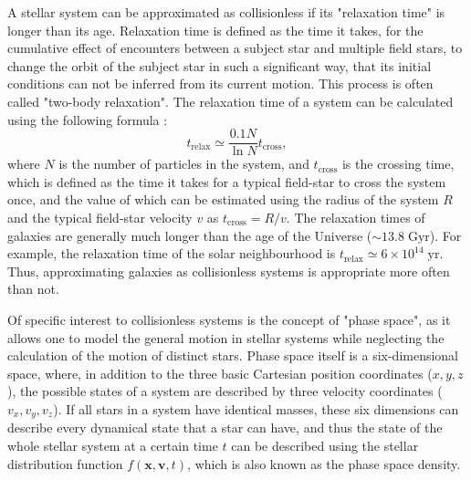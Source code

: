\documentclass[english, oneside]{HYgradu}
\begin{document}
A stellar system can be approximated as collisionless if its "relaxation time" is longer than its age. Relaxation time is defined as the time it takes, for the cumulative effect of encounters between a subject star and multiple field stars, to change the orbit of the subject star in such a significant way, that its initial conditions can not be inferred from its current motion. This process is often called "two-body relaxation". The relaxation time of a system can be calculated using the following formula \citep{BinneyTremaine}:
\begin{equation}
t_\mathrm{relax} \simeq \frac{0.1N}{\ln N} t_\mathrm{cross},
\end{equation}
where $N$ is the number of particles in the system, and $t_\mathrm{cross}$ is the crossing time, which is defined as the time it takes for a typical field-star to cross the system once, and the value of which can be estimated using the radius of the system $R$ and the typical field-star velocity $v$ as $t_\mathrm{cross} = R/v$. The relaxation times of galaxies are generally much longer than the age of the Universe ($\sim 13.8 \; \mathrm{Gyr}$). For example, the relaxation time of the solar neighbourhood is $t_\mathrm{relax} \simeq 6 \times 10^{14} \; \mathrm{yr}$. Thus, approximating galaxies as collisionless systems is appropriate more often than not.

Of specific interest to collisionless systems is the concept of "phase space", as it allows one to model the general motion in stellar systems while neglecting the calculation of the motion of distinct stars. Phase space itself is a six-dimensional space, where, in addition to the three basic Cartesian position coordinates ($x, y, z$), the possible states of a system are described by three velocity coordinates ($v_x, v_y, v_z$). If all stars in a system have identical masses, these six dimensions can describe every dynamical state that a star can have, and thus the state of the whole stellar system at a certain time $t$ can be described using the stellar distribution function $f(\mathbf{x}, \mathbf{v}, t)$, which is also known as the phase space density. 
\end{document}
